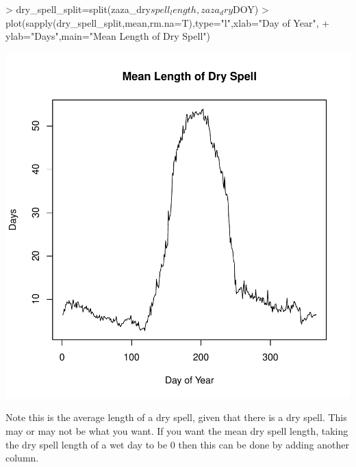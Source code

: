 \documentclass{article}
\begin{document}
\begin{Schunk}
\begin{Sinput}
> dry_spell_split=split(zaza_dry$spell_length,zaza_dry$DOY)
> plot(sapply(dry_spell_split,mean,rm.na=T),type="l",xlab="Day of Year",
+      ylab="Days",main="Mean Length of Dry Spell")
\end{Sinput}
\end{Schunk}
\includegraphics{climate_vignette-021}

Note this is the average length of a dry spell, given that there
is a dry spell.  This may or may not be what you want.  If you want
the mean dry spell length, taking the dry spell length of a wet day
to be 0 then this can be done by adding another column.
\end{document}
